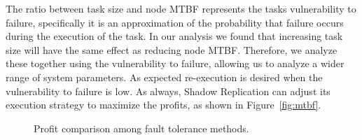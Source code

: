 The ratio between task size and node MTBF represents the tasks
vulnerability to failure, specifically it is an approximation of the
probability that failure occurs during the execution of the task. In our
analysis we found that increasing task size will have the same effect
as reducing node MTBF. Therefore, we analyze these together using the
vulnerability to failure, allowing us to analyze a wider range of
system parameters. As expected
re-execution is desired when the vulnerability to failure is
low. As always, Shadow Replication can adjust its execution strategy to maximize the profits, as shown in Figure~\ref{fig:mtbf}.

\begin{figure}[!h]	
	\begin{center}
		\caption{Profit comparison among fault tolerance methods.}
	\end{center}

\end{figure}




